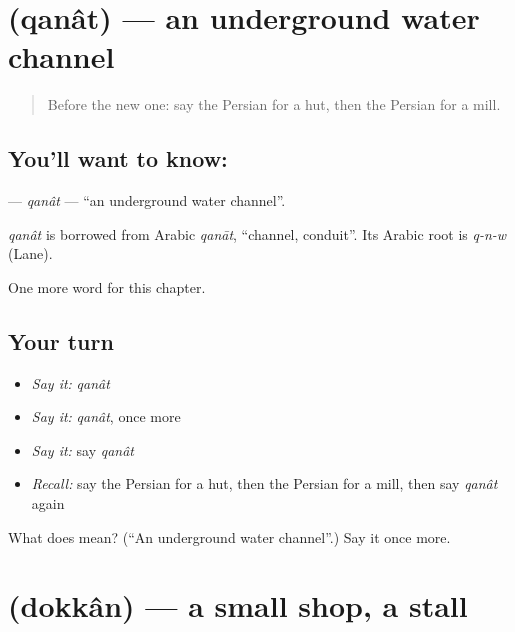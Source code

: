 \section[\texorpdfstring{\fa{قنات} (qanât)}{قنات (qanât)}]{ (qanât) — an underground water channel}

\label{lesson:FA-C156-qanat}



\begin{quote}
Before the new one: say the Persian for a hut, then the Persian for a mill.
\end{quote}

\subsection*{You'll want to know: }
\textbf{} — \emph{qanât} — \textquotedblleft{}an underground water channel\textquotedblright{}.

\begin{cousinweb}
\emph{qanât} is borrowed from Arabic \emph{qanāt}, \textquotedblleft{}channel, conduit\textquotedblright{}. Its Arabic root is \emph{q-n-w} (Lane).
\end{cousinweb}

\begin{grammarlens}[title={What you've built}]
One more word for this chapter.
\end{grammarlens}

\subsection*{Your turn}
\begin{itemize}
\raggedright
  \item \emph{Say it:} \emph{qanât}
  \item \emph{Say it:} \emph{qanât}, once more
  \item \emph{Say it:} say \emph{qanât}
  \item \emph{Recall:} say the Persian for a hut, then the Persian for a mill, then say \emph{qanât} again
\end{itemize}

\begin{tcolorbox}[breakable,colback=teal!4,colframe=teal!35!black,title={Before you move on}]
What does  mean? (\textquotedblleft{}An underground water channel\textquotedblright{}.) Say it once more.
\end{tcolorbox}
\section[\texorpdfstring{\fa{دکان} (dokkân)}{دکان (dokkân)}]{ (dokkân) — a small shop, a stall}

